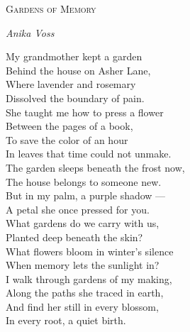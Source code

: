 \documentclass[12pt,a4paper]{article}
\newenvironment{poem}[2]{%
  \begin{center}
  {\Large\scshape\color{poetrynavy}#1\par}
  \vspace{0.4\baselineskip}
  {\itshape\color{poetrynavy!70}#2\par}
  \end{center}
  \vspace{1.5\baselineskip}
  \begin{center}
  \begin{minipage}{0.72\textwidth}
  \setlength{\parindent}{0pt}
  \setlength{\parskip}{0pt}
  \color{poetrynavy!85}
  \onehalfspacing
}{%
  \end{minipage}
  \end{center}
}
\begin{document}
\vspace*{\fill}

\newpage


\thispagestyle{fancy}
\vspace*{\fill}

\begin{poem}{Gardens of Memory}{Anika Voss}
My grandmother kept a garden\\
Behind the house on Asher Lane,\\
Where lavender and rosemary\\
Dissolved the boundary of pain.\\[1.5\baselineskip]

She taught me how to press a flower\\
Between the pages of a book,\\
To save the color of an hour\\
In leaves that time could not unmake.\\[1.5\baselineskip]

The garden sleeps beneath the frost now,\\
The house belongs to someone new.\\
But in my palm, a purple shadow ---\\
A petal she once pressed for you.\\[1.5\baselineskip]

What gardens do we carry with us,\\
Planted deep beneath the skin?\\
What flowers bloom in winter's silence\\
When memory lets the sunlight in?\\[1.5\baselineskip]

I walk through gardens of my making,\\
Along the paths she traced in earth,\\
And find her still in every blossom,\\
In every root, a quiet birth.
\end{poem}

\vspace*{\fill}
\end{document}
